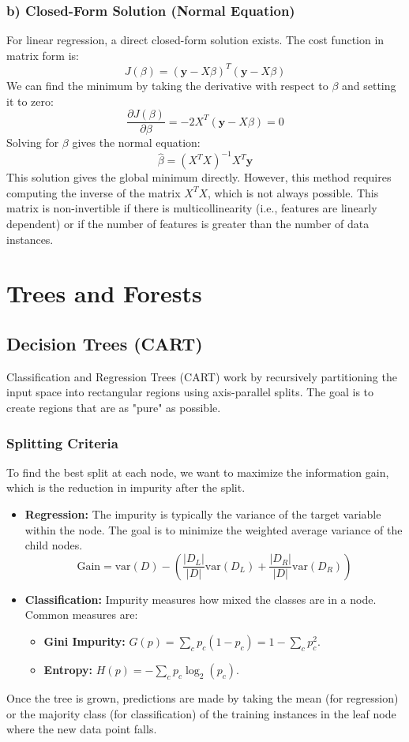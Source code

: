 \documentclass{article}
\begin{document}
\begin{multicols}{2}
	\subsubsection{b) Closed-Form Solution (Normal Equation)}
	For linear regression, a direct closed-form solution exists. The cost function in matrix form is:
	$$ J(\beta) = (\mathbf{y} - X\beta)^T (\mathbf{y} - X\beta) $$
	We can find the minimum by taking the derivative with respect to $\beta$ and setting it to zero:
	$$ \frac{\partial J(\beta)}{\partial \beta} = -2X^T(\mathbf{y} - X\beta) = 0 $$
	Solving for $\beta$ gives the normal equation:
	$$ \hat{\beta} = (X^T X)^{-1} X^T \mathbf{y} $$
	This solution gives the global minimum directly. However, this method requires computing the inverse of the matrix $X^T X$, which is not always possible. This matrix is non-invertible if there is multicollinearity (i.e., features are linearly dependent) or if the number of features is greater than the number of data instances.

	\section{Trees and Forests}
	\subsection{Decision Trees (CART)}
	Classification and Regression Trees (CART) work by recursively partitioning the input space into rectangular regions using axis-parallel splits. The goal is to create regions that are as "pure" as possible.

	\subsubsection{Splitting Criteria}
	To find the best split at each node, we want to maximize the information gain, which is the reduction in impurity after the split.
	\begin{itemize}
		\item \textbf{Regression:} The impurity is typically the variance of the target variable within the node. The goal is to minimize the weighted average variance of the child nodes.
		      $$ \text{Gain} = \text{var}(D) - \left( \frac{|D_L|}{|D|}\text{var}(D_L) + \frac{|D_R|}{|D|}\text{var}(D_R) \right) $$
		\item \textbf{Classification:} Impurity measures how mixed the classes are in a node. Common measures are:
		      \begin{itemize}
			      \item \textbf{Gini Impurity:} $G(p) = \sum_{c} p_c (1-p_c) = 1 - \sum_{c} p_c^2$.
			      \item \textbf{Entropy:} $H(p) = -\sum_{c} p_c \log_2(p_c)$.
		      \end{itemize}
	\end{itemize}
	Once the tree is grown, predictions are made by taking the mean (for regression) or the majority class (for classification) of the training instances in the leaf node where the new data point falls.


\end{multicols}
\end{document}
